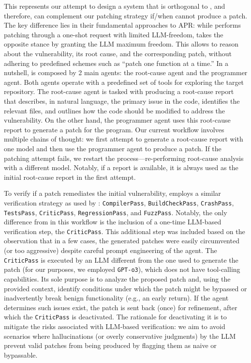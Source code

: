 This represents our attempt to design a system that is orthogonal to \patchery, and therefore, can complement our patching strategy if/when \patchery cannot produce a patch.
The key difference lies in their fundamental approaches to APR: while \patchery performs patching through a one-shot request with limited LLM-freedom, \patcherq{} takes the opposite stance by granting the LLM maximum freedom.
This allows \patcherq{} to reason about the vulnerability, its root cause, and the corresponding patch, without adhering to predefined schemes such as ``patch one function at a time.''
In a nutshell, \patcherq{} is composed by 2 main agents: the root-cause agent and the programmer agent.
Both agents operate with a predefined set of tools for exploring the target repository.
The root-cause agent is tasked with producing a root-cause report that describes, in natural language, the primary issue in the code, identifies the relevant files, and outlines how the code should be modified to address the vulnerability.
On the other hand, the programmer agent uses this root-cause report to generate a patch for the program.
Our current workflow involves multiple chains of thought: we first attempt to generate a root-cause report with one model and then use the programmer agent to produce a patch. If the patching attempt fails, we restart the process---re-performing root-cause analysis with a different model. Notably, if a \dyva report is available, it is always used as the initial root-cause report in the first attempt.

To verify if a patch remediates the initial vulnerability, \patcherq{} employs a similar verification strategy as used by \patchery: \texttt{CompilerPass}, \texttt{BuildCheckPass}, \texttt{CrashPass}, \texttt{TestsPass}, \texttt{CriticPass}, \texttt{RegressionPass}, and \texttt{FuzzPass}.
Notably, the only difference from \patchery in this workflow is the inclusion of a one-time LLM-based verification step, the \texttt{CriticPass}.
This additional step was included based on the observation that in a few cases, the generated patches were easily circumvented (or too aggressive) despite careful prompt engineering of the agent.
The \texttt{CriticPass} is executed by an LLM different from the one used to generate the patch (for our purposes, we employed \texttt{GPT-o3}), which does not have tool-calling capabilities.
Its sole purpose is to analyze the proposed patch and, using the provided context, identify conditions under which the patch might be bypassed or inadvertently break benign functionality (e.g., an early return).
If the agent determines such issues exist, the patch is sent back (once) for refinement, after which the \texttt{CriticPass} is deactivated.
The rationale for deactivating it is to mitigate the risks associated with LLM-based verification: we aim to avoid scenarios where hallucinations (or overly conservative judgments) by the LLM prevent valid patches from being produced by flagging them as naive or bypassable.


